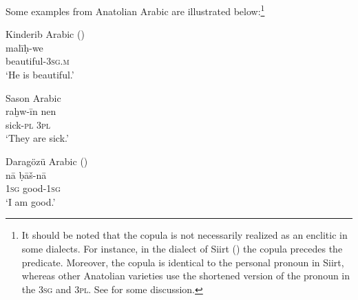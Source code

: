 \documentclass[output=paper]{langsci/langscibook}
\begin{document}
\noindent Some examples from Anatolian Arabic are illustrated below:\footnote{It should be noted that the copula is not necessarily realized as an enclitic in some dialects. For instance, in the dialect of 
Siirt (\citealt{Jastrow2011anatolian}) the copula precedes the
predicate. Moreover, the copula is identical to the personal pronoun in Siirt, whereas other Anatolian varieties use the shortened version of the pronoun in the 3\textsc{sg} and 3\textsc{pl}. See \cite{Akkus2016} for some discussion. }

\begin{exe}
\ex \label{copt} 
		\begin{xlist}
		\ex Kinderib Arabic (\citealt[131]{Jastrow1978}) \\\label{copkr}\gll malī\d{h}-we		\\
    beautiful-\textsc{3sg.m} \\
       \glt `He is beautiful.'

	\ex Sason Arabic \\
	\label{copts} \gll raḫw-īn nen\\
	sick-\textsc{pl} \textsc{3pl}\\		
        \glt  `They are sick.'
	
		\ex Daragözü Arabic (\citealt[40]{Jastrow1973})\\ \label{coparam} \gll  nā ḅāš-nā\\
		\textsc{1sg} good-\textsc{1sg}\\
      \glt  `I am good.'
        \end{xlist}
     
\end{exe}



			
\end{document}
